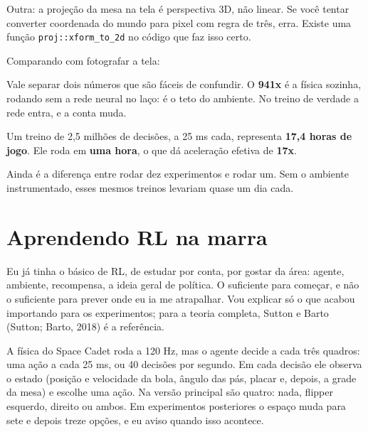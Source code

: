 \documentclass[10pt,a4paper,twoside,twocolumn]{scrartcl}
\let\oldtexttt\texttt
\renewcommand{\texttt}[1]{{\small\oldtexttt{#1}}}
\begin{document}
Outra: a projeção da mesa na tela é perspectiva 3D, não linear. Se você
tentar converter coordenada do mundo para pixel com regra de três, erra.
Existe uma função \texttt{proj::xform\_to\_2d} no código que faz isso
certo.

Comparando com fotografar a tela:

\vspace{0.2em}
\begin{center}\small
{}
\end{center}
\vspace{0.1em}


Vale separar dois números que são fáceis de confundir. O \textbf{941x} é
a física sozinha, rodando sem a rede neural no laço: é o teto do
ambiente. No treino de verdade a rede entra, e a conta muda.

Um treino de 2,5 milhões de decisões, a 25 ms cada, representa
\textbf{17,4 horas de jogo}. Ele roda em \textbf{uma hora}, o que dá
aceleração efetiva de \textbf{17x}.

Ainda é a diferença entre rodar dez experimentos e rodar um. Sem o
ambiente instrumentado, esses mesmos treinos levariam quase um dia cada.

\section{Aprendendo RL na marra}\label{aprendendo-rl-na-marra}

Eu já tinha o básico de RL, de estudar por conta, por gostar da área:
agente, ambiente, recompensa, a ideia geral de política. O suficiente
para começar, e não o suficiente para prever onde eu ia me atrapalhar.
Vou explicar só o que acabou importando para os experimentos; para a
teoria completa, Sutton e Barto (Sutton; Barto, 2018) é a referência.

A física do Space Cadet roda a 120 Hz, mas o agente decide a cada três
quadros: uma ação a cada 25 ms, ou 40 decisões por segundo. Em cada
decisão ele observa o estado (posição e velocidade da bola, ângulo das
pás, placar e, depois, a grade da mesa) e escolhe uma ação. Na versão
principal são quatro: nada, flipper esquerdo, direito ou ambos. Em
experimentos posteriores o espaço muda para sete e depois treze opções,
e eu aviso quando isso acontece.
\end{document}
